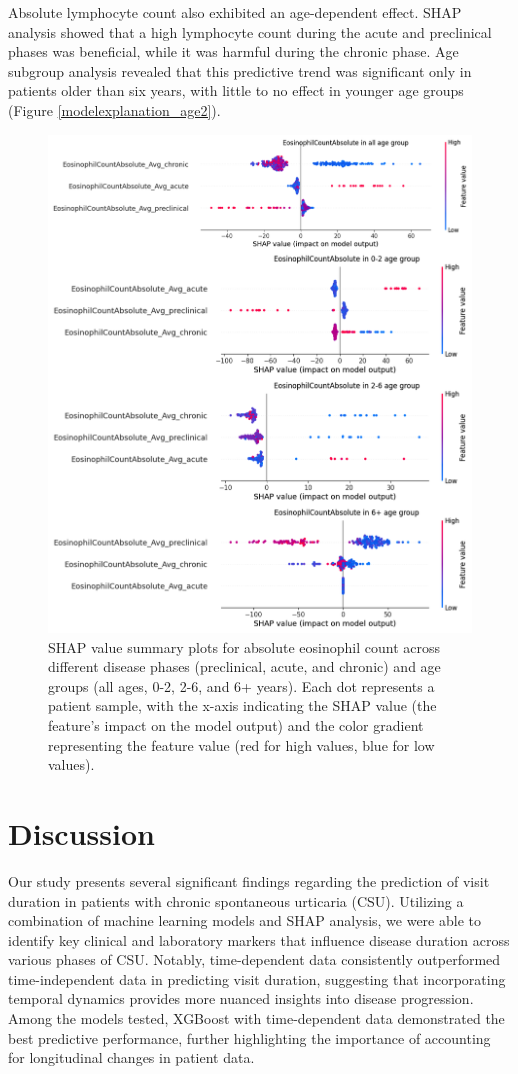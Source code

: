 \documentclass[final,3p,times,authoryear]{elsarticle}
\begin{document}
Absolute lymphocyte count also exhibited an age-dependent effect. SHAP analysis showed that a high lymphocyte count during the acute and preclinical phases was beneficial, while it was harmful during the chronic phase. Age subgroup analysis revealed that this predictive trend was significant only in patients older than six years, with little to no effect in younger age groups (Figure \ref{modelexplanation_age2}).
\begin{figure}[t]  
    \centering 
    \includegraphics[width=0.5\linewidth]{figures/modelexplanation_age.png}
    \caption{SHAP value summary plots for absolute eosinophil count across different disease phases (preclinical, acute, and chronic) and age groups (all ages, 0-2, 2-6, and 6+ years). Each dot represents a patient sample, with the x-axis indicating the SHAP value (the feature’s impact on the model output) and the color gradient representing the feature value (red for high values, blue for low values).}\label{modelexplanation_age}

\end{figure}


\section{Discussion}\label{Discussion}

Our study presents several significant findings regarding the prediction of visit duration in patients with chronic spontaneous urticaria (CSU). Utilizing a combination of machine learning models and SHAP analysis, we were able to identify key clinical and laboratory markers that influence disease duration across various phases of CSU. Notably, time-dependent data consistently outperformed time-independent data in predicting visit duration, suggesting that incorporating temporal dynamics provides more nuanced insights into disease progression. Among the models tested, XGBoost with time-dependent data demonstrated the best predictive performance, further highlighting the importance of accounting for longitudinal changes in patient data.
\end{document}
